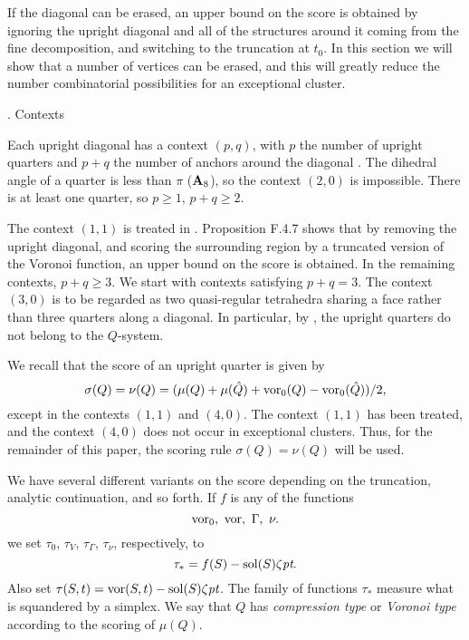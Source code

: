 If the diagonal can be erased, an upper bound on the score is obtained
by ignoring the upright diagonal and all of the structures around
it coming from the fine decomposition, and switching to the
truncation at $t_0$.   In this section we will show that a number
of vertices can be erased, and this will greatly reduce the 
number combinatorial possibilities for an exceptional cluster.

\subhead {}. Contexts\endsubhead

Each upright diagonal has a context $(p,q)$, with $p$
the number of upright quarters and $p+q$ the number
of anchors around the diagonal \cite{F}.  
The dihedral angle
of a quarter is less than $\pi$ (${\bold A}_8$), so the context
$(2,0)$ is impossible.
There is at least
one quarter, so $p\ge1$, $p+q\ge2$.  



The context $(1,1)$ is treated in \cite{F}.  Proposition F.4.7
shows that by removing the upright diagonal, and scoring the surrounding
region by a truncated version of the Voronoi function, an upper
bound on the score is obtained.
In the remaining contexts, $p+q\ge3$.  
We start with contexts satisfying $p+q=3$.
The context $(3,0)$ is
to be regarded as two quasi-regular tetrahedra sharing a face rather
than three quarters along a diagonal.  In particular, by \cite{F},
the upright quarters do not belong to the $Q$-system.

We recall that the score of an upright quarter is given by
$$\sigma(Q)=\nu(Q)=(\mu(Q)+\mu(\hat Q) + \operatorname{vor}_0(Q)-\operatorname{vor}_0(\hat Q))/2,$$
except in the contexts $(1,1)$ and $(4,0)$.  The context $(1,1)$
has been treated, and the context $(4,0)$ does
not occur in exceptional clusters.  Thus, for the remainder of this
paper, the scoring rule $\sigma(Q)=\nu(Q)$ will be used.

We have several different variants on the score depending on the
truncation, analytic continuation, and so forth.  If
$f$ is any of the functions 
$$\vor_0,\ \vor,\ \Gamma, \ \nu.$$
we set $\tau_{0}$, $\tau_V$, $\tau_\Gamma$, 
$\tau_\nu$, respectively,
to $$\tau_* = f(S) -\operatorname{sol}(S)\zeta\hbox{\it pt}.$$
Also set $\tau(S,t) = \operatorname{vor}(S,t)-\operatorname{sol}(S)\zeta\hbox{\it pt}$.
The family of functions $\tau_*$ measure what is squandered by
a simplex.  We say that $Q$ has 
{\it compression type\/} or {\it Voronoi type\/} 
according to the scoring of $\mu(Q)$.




